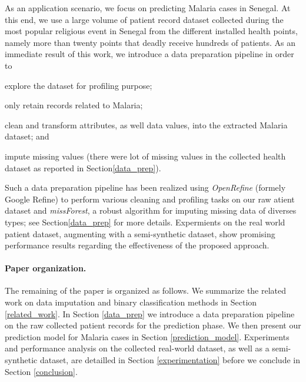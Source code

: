 As an application scenario, we focus on predicting Malaria cases in Senegal. At this end, we use  a large volume of patient record dataset collected during the most popular religious event in Senegal from the different installed health points, namely more than twenty points that deadly receive hundreds of patients.
As an immediate result of this work, we introduce a data preparation pipeline in order to 
\begin{inparaenum}[(i)]
\item explore the dataset for profiling purpose;
\item only retain records related to Malaria;
\item clean and transform attributes, as well data values, into the extracted Malaria dataset; and 
\item impute missing values (there were lot of missing values in the collected health dataset as reported in Section\ref{data_prep}).
\end{inparaenum}
Such a data preparation pipeline has been realized using \emph{OpenRefine} (formely Google Refine) to perform various cleaning and profiling tasks on our raw atient dataset and \emph{missForest}, a robust
 algorithm for imputing  missing data of diverses types; see Section\ref{data_prep} for more details. 
Expermients on the real world patient dataset, augmenting with a semi-synthetic dataset, show promising performance results regarding the effectiveness of the proposed approach.

\paragraph*{Paper organization.}The remaining of the paper is organized as follows. We summarize the related work on data imputation and binary classification methods in Section \ref{related_work}.
In Section \ref{data_prep} we introduce a data preparation pipeline on the raw collected patient records for the prediction phase. 
We then present our prediction model for Malaria cases in Section \ref{prediction_model}.
Experiments and performance analysis  on the collected real-world dataset, as well as a semi-synthetic dataset,  are detailled in Section \ref{experimentation} before we conclude in Section \ref{conclusion}. 
